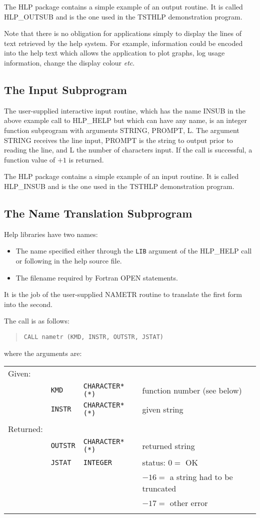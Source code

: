 The HLP package contains a simple example of an output routine.  It
is called HLP\_OUTSUB and is the one used in the TSTHLP demonstration
program.

Note that there is no obligation for applications simply to display
the lines of text retrieved by the help system.  For example,
information could be encoded into the help text which allows the
application to plot graphs, log usage information, change the
display colour {\it etc}.

\subsection{The Input Subprogram}
The user-supplied interactive input routine, which has the name INSUB
in the above
example call to HLP\_HELP but which can have any name, is an
integer function subprogram with arguments STRING, PROMPT, L.
The argument STRING
receives the line input, PROMPT is the string to output prior to
reading the line, and L the number of characters input.  If the
call is successful, a function value of $+1$ is returned.

The HLP package contains a simple example of an input routine.  It
is called HLP\_INSUB and is the one used in the TSTHLP demonstration
program.

\subsection{The Name Translation Subprogram}
Help libraries have two names:
\begin{itemize}
\item The name specified either through the {\tt LIB} argument of the
HLP\_HELP call or following  in the help source file.
\item The filename required by Fortran OPEN statements.
\end{itemize}
It is the job of the user-supplied
NAMETR routine to translate the first form into the second.

The call is as follows:
\begin{verse}
{\tt CALL nametr (KMD, INSTR, OUTSTR, JSTAT)}
\end{verse}
where the arguments are:

\begin{tabular}{llll}
\\
Given: \\
& {\tt KMD} & {\tt CHARACTER*(*)} & function number (see below) \\
& {\tt INSTR} & {\tt CHARACTER*(*)} & given string \\ \\
Returned: \\
& {\tt OUTSTR} & {\tt CHARACTER*(*)} & returned string \\
& {\tt JSTAT} & {\tt INTEGER} & status:  $0=$ OK \\
& & & \hspace{1.7em}         $-16=$ a string had to be truncated \\
& & & \hspace{1.7em}         $-17=$ other error \\ \\
\end{tabular}

